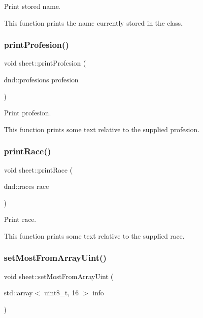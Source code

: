 Print stored name. 

This function prints the name currently stored in the class. \mbox{\label{classsheet_aeaee0f027d25a9076ebabad9bcb51a40}} 
\subsubsection{\texorpdfstring{print\+Profesion()}{printProfesion()}}
{\footnotesize\ttfamily void sheet\+::print\+Profesion (\begin{DoxyParamCaption}\item[{dnd\+::profesions}]{profesion }\end{DoxyParamCaption})}



Print profesion. 

This function prints some text relative to the supplied profesion. \mbox{\label{classsheet_a84f442ba9c1fe19f04bc1e8eed30c8c4}} 
\subsubsection{\texorpdfstring{print\+Race()}{printRace()}}
{\footnotesize\ttfamily void sheet\+::print\+Race (\begin{DoxyParamCaption}\item[{dnd\+::races}]{race }\end{DoxyParamCaption})}



Print race. 

This function prints some text relative to the supplied race. \mbox{\label{classsheet_a64845c424dc2e36b3d8268cac104d4b3}} 
\subsubsection{\texorpdfstring{set\+Most\+From\+Array\+Uint()}{setMostFromArrayUint()}}
{\footnotesize\ttfamily void sheet\+::set\+Most\+From\+Array\+Uint (\begin{DoxyParamCaption}\item[{std\+::array$<$ uint8\+\_\+t, 16 $>$}]{info }\end{DoxyParamCaption})}



